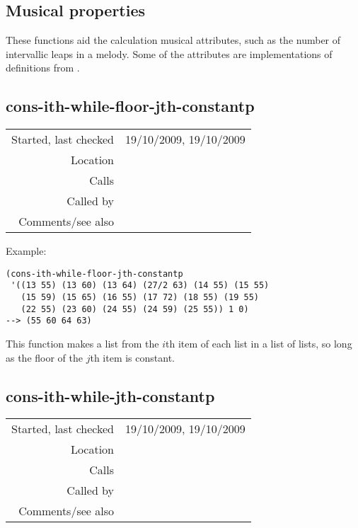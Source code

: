 \subsection{Musical properties}\label{sec:musical-properties}

These functions aid the calculation musical
attributes, such as the number of intervallic leaps in
a melody. Some of the attributes are implementations
of definitions from
\citet*{pearce2007,vonHippel2000,eerola2000}.


\subsection*{cons-ith-while-floor-jth-constantp}\label{fun:cons-ith-while-floor-jth-constantp}

\vspace{0.3cm}
\begin{tabular}{r|p{8cm}}
Started, last checked & 19/10/2009, 19/10/2009 \\
Location & \nameref{sec:musical-properties} \\
Calls & \\
Called by & \nameref{fun:density} \\
Comments/see also & \nameref{fun:cons-ith-while-jth-constantp}
\end{tabular}

\vspace{0.5cm}
\noindent Example:
\begin{verbatim}
(cons-ith-while-floor-jth-constantp
 '((13 55) (13 60) (13 64) (27/2 63) (14 55) (15 55)
   (15 59) (15 65) (16 55) (17 72) (18 55) (19 55)
   (22 55) (23 60) (24 55) (24 59) (25 55)) 1 0)
--> (55 60 64 63)
\end{verbatim}

\noindent This function makes a list from the $i$th
item of each list in a list of lists, so long as the
floor of the $j$th item is constant.


\subsection*{cons-ith-while-jth-constantp}\label{fun:cons-ith-while-jth-constantp}

\vspace{0.3cm}
\begin{tabular}{r|p{8cm}}
Started, last checked & 19/10/2009, 19/10/2009 \\
Location & \nameref{sec:musical-properties} \\
Calls & \\
Called by & \nameref{fun:top-line} \\
Comments/see also & \nameref{fun:cons-ith-while-floor-jth-constantp}
\end{tabular}

